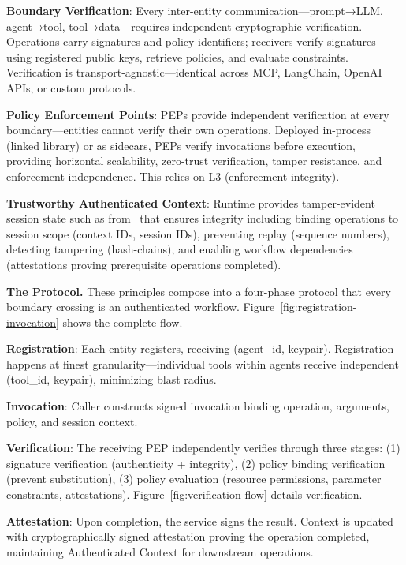 \textbf{Boundary Verification}: Every inter-entity communication—prompt→LLM, agent→tool, tool→data—requires independent cryptographic verification. Operations carry signatures and policy identifiers; receivers verify signatures using registered public keys, retrieve policies, and evaluate constraints. Verification is transport-agnostic—identical across MCP, LangChain, OpenAI APIs, or custom protocols.

\textbf{Policy Enforcement Points}: PEPs provide independent verification at every boundary—entities cannot verify their own operations. Deployed in-process (linked library) or as sidecars, PEPs verify invocations before execution, providing horizontal scalability, zero-trust verification, tamper resistance, and enforcement independence. This relies on L3 (enforcement integrity).

\textbf{Trustworthy Authenticated Context}: Runtime provides tamper-evident session state such as from~\cite{rajagopalan2025prompts} that ensures integrity including binding operations to session scope (context IDs, session IDs), preventing replay (sequence numbers), detecting tampering (hash-chains), and enabling workflow dependencies (attestations proving prerequisite operations completed).



\noindent\textbf{The Protocol.}
These principles compose into a four-phase protocol that every boundary crossing is an authenticated workflow. Figure~\ref{fig:registration-invocation} shows the complete flow.

\textbf{Registration}: Each entity registers, receiving (agent\_id, keypair). Registration happens at finest granularity—individual tools within agents receive independent (tool\_id, keypair), minimizing blast radius.

\textbf{Invocation}: Caller constructs signed invocation binding operation, arguments, policy, and session context.

\textbf{Verification}: The receiving PEP independently verifies through three stages: (1) signature verification (authenticity + integrity), (2) policy binding verification (prevent substitution), (3) policy evaluation (resource permissions, parameter constraints, attestations). Figure~\ref{fig:verification-flow} details verification.

\textbf{Attestation}: Upon completion, the service signs the result. Context is updated with cryptographically signed attestation proving the operation completed, maintaining Authenticated Context for downstream operations.


